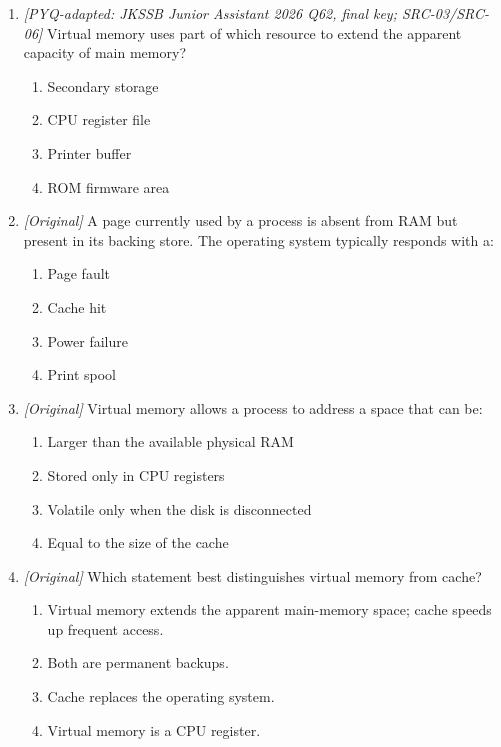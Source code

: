 \begin{enumerate}[label=\textbf{Q\arabic*.}, leftmargin=*]
\begin{enumerate}[label=\Alph*.]
    \item Thrashing means excessive paging with little progress.
    \item Virtual memory is a special RAM chip on the motherboard.
  \end{enumerate}
\item \textit{[PYQ-adapted: JKSSB Junior Assistant 2026 Q62, final key; SRC-03/SRC-06]} Virtual memory uses part of which resource to extend the apparent capacity of main memory?
  \begin{enumerate}[label=\Alph*.]
\item Secondary storage
   \item CPU register file
   \item Printer buffer
   \item ROM firmware area
  \end{enumerate}

\item \textit{[Original]} A page currently used by a process is absent from RAM but present in its backing store. The operating system typically responds with a:
  \begin{enumerate}[label=\Alph*.]
\item Page fault
   \item Cache hit
   \item Power failure
   \item Print spool
  \end{enumerate}

\item \textit{[Original]} Virtual memory allows a process to address a space that can be:
  \begin{enumerate}[label=\Alph*.]
\item Larger than the available physical RAM
   \item Stored only in CPU registers
   \item Volatile only when the disk is disconnected
   \item Equal to the size of the cache
  \end{enumerate}

\item \textit{[Original]} Which statement best distinguishes virtual memory from cache?
  \begin{enumerate}[label=\Alph*.]
\item Virtual memory extends the apparent main-memory space; cache speeds up frequent access.
   \item Both are permanent backups.
   \item Cache replaces the operating system.
   \item Virtual memory is a CPU register.
  \end{enumerate}


\end{enumerate}
